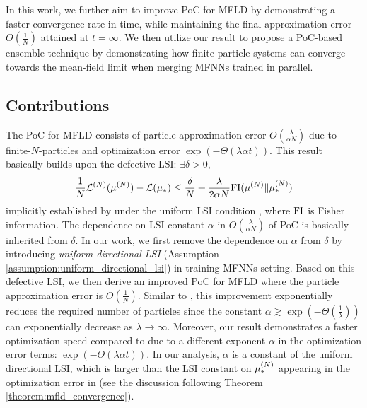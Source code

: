 In this work, we further aim to improve PoC for MFLD by demonstrating a faster convergence rate in time, while maintaining the final approximation error $O\left(\frac{1}{N}\right)$ attained at $t=\infty$. We then utilize our result to propose a PoC-based ensemble technique by demonstrating how finite particle systems can converge towards the mean-field limit when merging MFNNs trained in parallel.

\subsection{Contributions} \label{subsec:contributions}
The PoC for MFLD \cite{chen2022uniform,suzuki2023convergence} consists of particle approximation error $O\left(\frac{\lambda}{\alpha N}\right)$ due to finite-$N$-particles and optimization error $\exp(-\Theta(\lambda \alpha t))$. This result basically builds upon the defective LSI: $\exists \delta>0$,
\[ \frac{1}{N}\pow[\cL,N](\pow[\mu,N]) - \cL(\mu_*) \leq \frac{\delta}{N} + \frac{\lambda}{2\alpha N}\FI(\pow[\mu,N]\|\pow[\mu,N]_*) \]
implicitly established by \citet{chen2022uniform} under the uniform LSI condition \cite{nitanda2022convex,chizat2022mean}, where $\mathrm{FI}$ is Fisher information. The dependence on LSI-constant $\alpha$ in $O\left(\frac{\lambda}{\alpha N}\right)$ of PoC is basically inherited from $\delta$. In our work, we first remove the dependence on $\alpha$ from $\delta$ by introducing {\it uniform directional LSI} (Assumption \ref{assumption:uniform_directional_lsi}) in training MFNNs setting. Based on this defective LSI, we then derive an improved PoC for MFLD where the particle approximation error is $O\left(\frac{1}{N}\right)$. Similar to \citet{nitanda2024improved}, this improvement exponentially reduces the required number of particles since the constant $\alpha\gtrsim \exp\left(-\Theta(\frac{1}{\lambda})\right)$ can exponentially decrease as $\lambda \to \infty$. Moreover, our result demonstrates a faster optimization speed compared to \citet{nitanda2024improved,chewi2024uniform} due to a different exponent $\alpha$ in the optimization error terms: $\exp(-\Theta(\lambda \alpha t))$. In our analysis, $\alpha$ is a constant of the uniform directional LSI, which is larger than the LSI constant on $\pow[\mu,N]_*$ appearing in the optimization error in \citet{nitanda2024improved,chewi2024uniform} (see the discussion following Theorem \ref{theorem:mfld_convergence}).

